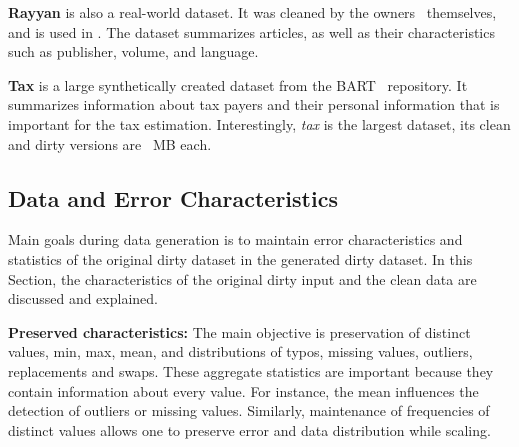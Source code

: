 \textbf{Rayyan} is also a real-world dataset. 
It was cleaned by the owners~\cite{QuzzaniHFE2016} themselves, and is used in \textcite{MahdaviAFMQST2019, MahdaviA2020}.
The dataset summarizes articles, as well as their characteristics such as publisher, volume, and language.

\textbf{Tax} is a large synthetically created dataset from the BART~\cite{bart} repository.
It summarizes information about tax payers and their personal information that is important for the tax estimation.
Interestingly, \textit{tax} is the largest dataset, its clean and dirty versions are \ MB each.

\subsection{Data and Error Characteristics}
\label{sec:data_characteristics}
Main goals during data generation is to maintain error characteristics and  statistics of the original dirty dataset in the generated dirty dataset.
In this Section, the characteristics of the original dirty input and the clean data are discussed and explained. 

\textbf{Preserved characteristics:} 
The main objective is preservation of distinct values, min, max, mean, and distributions of typos, missing values, outliers, replacements and swaps.
These aggregate statistics are important because they contain information about every value.
For instance, the mean influences the detection of outliers or missing values.
Similarly, maintenance of frequencies of distinct values allows one to preserve error and data distribution while scaling.


